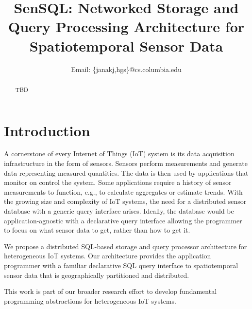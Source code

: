 \documentclass[conference,10pt]{IEEEtran}
\newcommand{\papertitle}{SenSQL: Networked Storage and Query Processing Architecture for Spatiotemporal Sensor Data}
\begin{document}
\title{\papertitle}

\author{
  Email: \{janakj,hgs\}@cs.columbia.edu
}

\maketitle

\begin{abstract}
TBD
\end{abstract}

\section{Introduction}
\label{sec:introduction}

A cornerstone of every Internet of Things (IoT) system is its data acquisition infrastructure in the form of sensors. Sensors perform measurements and generate data representing measured quantities. The data is then used by applications that monitor on control the system. Some applications require a history of sensor measurements to function, e.g., to calculate aggregates or estimate trends. With the growing size and complexity of IoT systems, the need for a distributed sensor database with a generic query interface arises. Ideally, the database would be application-agnostic with a declarative query interface allowing the programmer to focus on what sensor data to get, rather than how to get it.

We propose a distributed SQL-based storage and query processor architecture for heterogeneous IoT systems. Our architecture provides the application programmer with a familiar declarative SQL query interface to spatiotemporal sensor data that is geographically partitioned and distributed.

This work is part of our broader research effort to develop fundamental programming abstractions for heterogeneous IoT systems.


%
\end{document}
